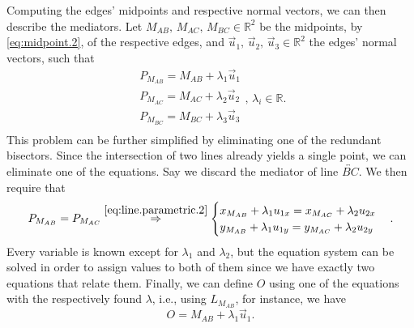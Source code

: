 \begin{comment}
This comes as a direct result from applying a rotation transformation of 90
degrees, or $\pi/2$ radians, to $\vec{u}$, like so
%
\[
  \vec{n} = R(\pi/2)\vec{u}%
  = \begin{bmatrix}
      \cos(\pi/2) & -\sin(\pi/2) \\
      \sin(\pi/2) & \cos(\pi/2)
    \end{bmatrix}
    \begin{bmatrix}
      u_1 \\ u_2
    \end{bmatrix}
  = \begin{bmatrix}
      0 & -1 \\
      1 & 0
    \end{bmatrix}
    \begin{bmatrix}
      u_1 \\ u_2
    \end{bmatrix}
  = \begin{bmatrix}
      -u_2 \\ u_1
    \end{bmatrix}.
\]
%
Let $\vec{u},\,\vec{n} \in \mathbb{R}^2$, such that $\vec{u} = (u_x,
u_y),\,\vec{n} = (-u_y, u_x)$.  From~\eqref{eq:vector.dot.2}, we have
\[ \vec{u} \cdot \vec{n} = u_x u_y - u_y u_x = 0.  \]
\end{comment}

Computing the edges' midpoints and respective normal vectors, we can then
describe the mediators.  Let $M_{AB},\,M_{AC},\,M_{BC} \in \mathbb{R}^2$ be the
midpoints, by \cref{eq:midpoint.2}, of the respective edges, and
$\vec{u}_1,\,\vec{u}_2,\,\vec{u}_3 \in \mathbb{R}^2$ the edges' normal vectors,
such that
\[
  \begin{split}
    P_{M_{AB}} = M_{AB} + \lambda_1 \vec{u}_1 \\
    P_{M_{AC}} = M_{AC} + \lambda_2 \vec{u}_2 \\
    P_{M_{BC}} = M_{BC} + \lambda_3 \vec{u}_3 \\
  \end{split},\,\lambda_i \in \mathbb{R}.
\]
This problem can be further simplified by eliminating one of the redundant
bisectors.  Since the intersection of two lines already yields a single point,
we can eliminate one of the equations.  Say we discard the mediator of line
$\overleftrightarrow{BC}$.  We then require that
\[
  P_{M_{AB}} = P_{M_{AC}} \stackrel{\eqref{eq:line.parametric.2}}{\Rightarrow}
  \begin{cases}
    x_{M_{AB}} + \lambda_1 u_{1x} = x_{M_{AC}} + \lambda_2 u_{2x} \\
    y_{M_{AB}} + \lambda_1 u_{1y} = y_{M_{AC}} + \lambda_2 u_{2y} \\
  \end{cases}.
\]
Every variable is known except for $\lambda_1$ and $\lambda_2$, but the equation
system can be solved in order to assign values to both of them since we have
exactly two equations that relate them.  Finally, we can define $O$ using one of
the equations with the respectively found $\lambda$, i.e., using $L_{M_{AB}}$,
for instance, we have \[ O = M_{AB} + \lambda_1 \vec{u}_1. \]

